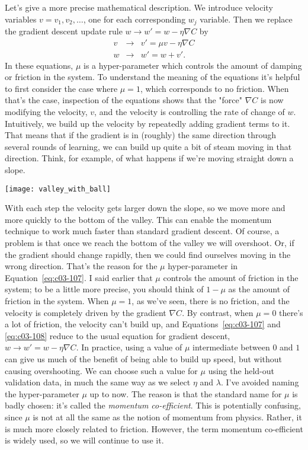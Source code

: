 Let's give a more precise mathematical description. We introduce velocity variables $v = v_1, v_2, \ldots$, one for each corresponding $w_j$ variable. Then we replace the gradient descent update rule $w \rightarrow w'= w-\eta \nabla C$ by 
\begin{eqnarray} 
v & \rightarrow & v' = \mu v - \eta \nabla C 
\label{eq:c03-107}\\ 
w & \rightarrow & w' = w+v'. 
\label{eq:c03-108}
\end{eqnarray} 
In these equations, $\mu$ is a hyper-parameter which controls the amount of damping or friction in the system. To understand the meaning of the equations it's helpful to first consider the case where $\mu = 1$, which corresponds to no friction. When that's the case, inspection of the equations shows that the "force" $\nabla C$ is now modifying the velocity, $v$, and the velocity is controlling the rate of change of $w$. Intuitively, we build up the velocity by repeatedly adding gradient terms to it. That means that if the gradient is in (roughly) the same direction through several rounds of learning, we can build up quite a bit of steam moving in that direction. Think, for example, of what happens if we're moving straight down a slope.

\begin{marginfigure}
    \texttt{[image: valley\_with\_ball]}
    \end{marginfigure}

With each step the velocity gets larger down the slope, so we move more and more quickly to the bottom of the valley. This can enable the momentum technique to work much faster than standard gradient descent. Of course, a problem is that once we reach the bottom of the valley we will overshoot. Or, if the gradient should change rapidly, then we could find ourselves moving in the wrong direction. That's the reason for the $\mu$ hyper-parameter in Equation~\ref{eq:c03-107}. I said earlier that $\mu$ controls the amount of friction in the system; to be a little more precise, you should think of $1-\mu$ as the amount of friction in the system. When $\mu = 1$, as we've seen, there is no friction, and the velocity is completely driven by the gradient $\nabla C$. By contrast, when $\mu = 0$ there's a lot of friction, the velocity can't build up, and Equations~\ref{eq:c03-107} and \ref{eq:c03-108} reduce to the usual equation for gradient descent, $w \rightarrow w'=w-\eta \nabla C$. In practice, using a value of $\mu$ intermediate between $0$ and $1$ can give us much of the benefit of being able to build up speed, but without causing overshooting. We can choose such a value for $\mu$ using the held-out validation data, in much the same way as we select $\eta$ and $\lambda$.
I've avoided naming the hyper-parameter $\mu$ up to now. The reason is that the standard name for $\mu$ is badly chosen: it's called the \textit{momentum co-efficient}. This is potentially confusing, since $\mu$ is not at all the same as the notion of momentum from physics. Rather, it is much more closely related to friction. However, the term momentum co-efficient is widely used, so we will continue to use it.

